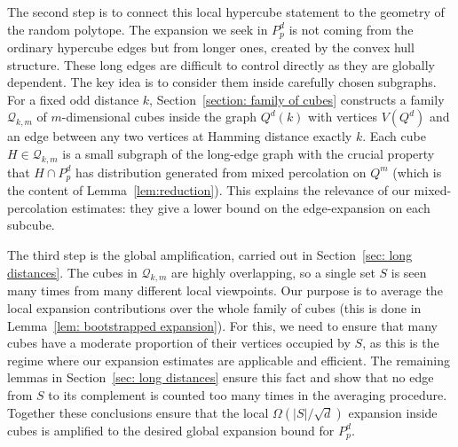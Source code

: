 \documentclass{article}
\theoremstyle{definition}
\newcommand{\cQ}{\mathcal{Q}}
\begin{document}
The second step is to connect this local hypercube statement to the geometry of the random polytope. 
The expansion we seek in $P^d_p$ is not coming from the ordinary hypercube edges but from longer ones, created by the convex hull structure. 
These long edges are difficult to control directly as they are globally dependent. 
The key idea is to consider them inside carefully chosen subgraphs. 
For a fixed odd distance $k$, Section~\ref{section: family of cubes} constructs a family $\cQ_{k,m}$ of $m$-dimensional cubes inside the graph $Q^d(k)$ with vertices $V(Q^d)$ and an edge between any two vertices at Hamming distance exactly $k$.
Each cube $H\in \cQ_{k,m}$ is a small subgraph of the long-edge graph with the crucial property that
$H\cap P^d_p$ has distribution generated from mixed percolation on $Q^m$
(which is the content of Lemma~\ref{lem:reduction}). 
This explains the relevance of our mixed-percolation estimates: they give a lower bound on the edge-expansion on each subcube.

The third step is the global amplification, carried out in Section~\ref{sec: long distances}. The cubes in $\cQ_{k,m}$ are highly overlapping, so a single set $S$ is seen many times from many different local viewpoints. 
Our purpose is to average the local expansion contributions over the whole family of cubes (this is done in Lemma~\ref{lem: bootstrapped expansion}).
For this, we need to ensure that many cubes have a moderate proportion of their vertices occupied by $S$, as this is the regime where our expansion estimates are applicable and efficient.
The remaining lemmas in Section~\ref{sec: long distances} ensure this fact and show that no edge from $S$ to its complement is counted too many times in the averaging procedure.
Together these conclusions ensure that the local $\Omega(|S|/\sqrt d)$ expansion inside cubes is amplified to the desired global expansion bound for $P_p^d$.
\end{document}
